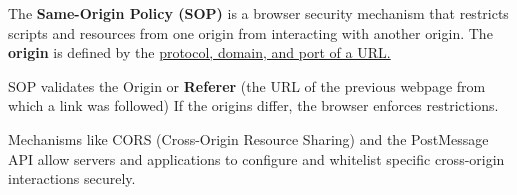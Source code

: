 \begin{theo}

\label{theo:same_origin_policy}
The \textbf{Same-Origin Policy (SOP)} is a browser security mechanism that restricts scripts and resources from one origin from interacting with another origin. The \textbf{origin} is defined by the
\underline{protocol, domain, and port of a URL.}

SOP validates the Origin or \textbf{Referer} (the URL of the previous webpage from which a link was followed)
If the origins differ, the browser enforces restrictions.

Mechanisms like CORS (Cross-Origin Resource Sharing) and the PostMessage API allow servers and applications to configure and whitelist specific cross-origin interactions securely.
\end{theo}
    

\newpage 


